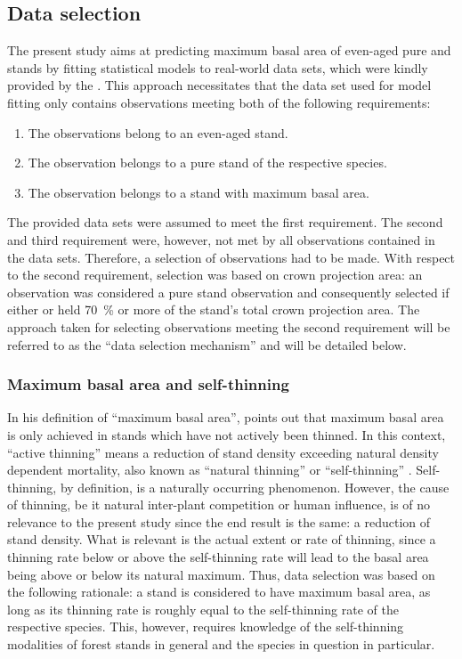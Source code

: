 \subsection{Data selection}
The present study aims at predicting maximum basal area of even-aged pure \Beech{} and \Spruce{} stands by fitting statistical models to real-world data sets, which were kindly provided by the \NWFVA{}.  This approach necessitates that the data set used for model fitting only contains observations meeting both of the following requirements:
\begin{enumerate}
\item The observations belong to an even-aged stand.
\item The observation belongs to a pure stand of the respective species.
\item The observation belongs to a stand with maximum basal area.
\end{enumerate}
The provided data sets were assumed to meet the first requirement.  The second and third requirement were, however, not met by all observations contained in the data sets.  Therefore, a selection of observations had to be made.  With respect to the second requirement, selection was based on crown projection area: an observation was considered a pure stand observation and consequently selected if either \Beech{} or \Spruce{} held \SI{70}{\percent} or more of the stand’s total crown projection area.  The approach taken for selecting observations meeting the second requirement will be referred to as the ``data selection mechanism'' and will be detailed below.

\subsubsection{Maximum basal area and self-thinning}

In his definition of ``maximum basal area'', \textcite{Assmann1970} points out that maximum basal area is only achieved in stands which have not actively been thinned.  In this context, ``active thinning'' means a reduction of stand density exceeding natural density dependent mortality, also known as ``natural thinning'' \parencite{SAF1958} or ``self-thinning'' \parencite{Roehrig1992}.  Self-thinning, by definition, is a naturally occurring phenomenon.  However, the cause of thinning, be it natural inter-plant competition or human influence, is of no relevance to the present study since the end result is the same: a reduction of stand density.  What is relevant is the actual extent or rate of thinning, since a thinning rate below or above the self-thinning rate will lead to the basal area being above or below its natural maximum.  Thus, data selection was based on the following rationale: a stand is considered to have maximum basal area, as long as its thinning rate is roughly equal to the self-thinning rate of the respective species.  This, however, requires knowledge of the self-thinning modalities of forest stands in general and the species in question in particular.

